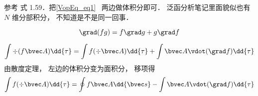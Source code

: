
\begin{issues}
\issueDraft
\end{issues}


参考\cite{GriffE} 式 1.59．把\autoref{VopEq_eq1}~ 两边做体积分即可． 泛函分析笔记里面貌似也有 $N$ 维分部积分， 不知道是不是同一回事．


\begin{equation}
\grad (fg) = f\grad g + g \grad f
\end{equation}



\begin{equation}
\int\div (f \bvec A) \dd{\tau} = \int f (\div \bvec A)\dd{\tau} + \int\bvec A \vdot (\grad f)\dd{\tau}
\end{equation}
由散度定理， 左边的体积分变为面积分， 移项得
\begin{equation}
\int f (\div \bvec A)\dd{\tau} =  \oint f \bvec A \dd{\bvec s} - \int\bvec A \vdot (\grad f)\dd{\tau}
\end{equation}
